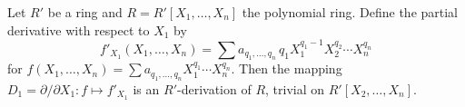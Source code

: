Let $R'$ be a ring and $R = R'[X_1, \ldots, X_n]$ the polynomial ring. Define the partial derivative with respect to $X_1$ by
$$f'_{X_1}(X_1, \ldots, X_n) = \sum a_{q_1, \ldots, q_n} \, q_1 X_1^{q_1-1} X_2^{q_2} \cdots X_n^{q_n}$$
for $f(X_1, \ldots, X_n) = \sum a_{q_1, \ldots, q_n} X_1^{q_1} \cdots X_n^{q_n}$. Then the mapping $D_1 = \partial/\partial X_1 \colon f \mapsto f'_{X_1}$ is an $R'$-derivation of $R$, trivial on $R'[X_2, \ldots, X_n]$.
